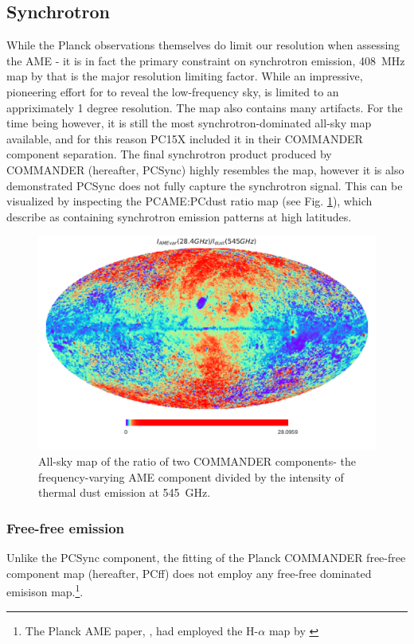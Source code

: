        \subsection{Synchrotron}
        While the Planck observations themselves do limit our resolution when assessing the AME - it is in fact the primary constraint on synchrotron emission, 408~MHz map by \cite{haslam82} that is the major resolution limiting factor. While an impressive, pioneering effort for to reveal the low-frequency sky, \citep{haslam82} is limited to an appriximately 1 degree resolution. The map also contains
        many artifacts. For the time being however, it is still the most synchrotron-dominated all-sky map available, and for this reason PC15X included it in their COMMANDER component separation. The final synchrotron product produced by COMMANDER (hereafter, PCSync) highly resembles the \citep{haslam82} map, however it is also demonstrated PCSync does not fully capture the synchrotron signal. This can be visualized by inspecting the PCAME:PCdust ratio map (see Fig. \ref{fig:R_PCAMEtoPCdust}), which \cite{hensley17} describe as containing synchrotron emission patterns at high latitudes.

        \begin{figure}
        \label{fig:R_PCAMEtoPCdust}
        \centering
        \includegraphics[width=\textwidth]{../Plots/ch_datasources/R_PCAMEtoPCRad.pdf}
        \caption{All-sky map of the ratio of two COMMANDER components- the frequency-varying AME component divided by the intensity of thermal dust emission at 545~GHz. }
        \end{figure}

       \subsubsection{Free-free emission}
        Unlike the PCSync component, the fitting of the Planck COMMANDER free-free component map (hereafter, PCff) does not employ any free-free dominated emisison map.\footnote{The Planck AME paper, \cite{planckXV}, had employed the H-$\alpha$ map by \cite{wham98}}.

